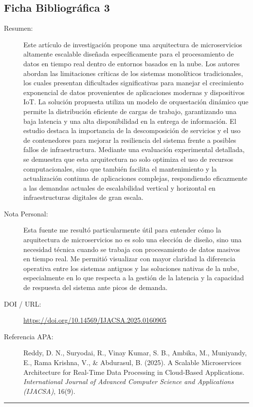 \documentclass[12pt]{article}
\begin{document}
\subsection{Ficha Bibliográfica 3}
\begin{description}
    \item[Resumen:] Este artículo de investigación propone una arquitectura de microservicios altamente escalable diseñada específicamente para el procesamiento de datos en tiempo real dentro de entornos basados en la nube. Los autores abordan las limitaciones críticas de los sistemas monolíticos tradicionales, los cuales presentan dificultades significativas para manejar el crecimiento exponencial de datos provenientes de aplicaciones modernas y dispositivos IoT. La solución propuesta utiliza un modelo de orquestación dinámico que permite la distribución eficiente de cargas de trabajo, garantizando una baja latencia y una alta disponibilidad en la entrega de información. El estudio destaca la importancia de la descomposición de servicios y el uso de contenedores para mejorar la resiliencia del sistema frente a posibles fallos de infraestructura. Mediante una evaluación experimental detallada, se demuestra que esta arquitectura no solo optimiza el uso de recursos computacionales, sino que también facilita el mantenimiento y la actualización continua de aplicaciones complejas, respondiendo eficazmente a las demandas actuales de escalabilidad vertical y horizontal en infraestructuras digitales de gran escala.
    \item[Nota Personal:] Esta fuente me resultó particularmente útil para entender cómo la arquitectura de microservicios no es solo una elección de diseño, sino una necesidad técnica cuando se trabaja con procesamiento de datos masivos en tiempo real. Me permitió visualizar con mayor claridad la diferencia operativa entre los sistemas antiguos y las soluciones nativas de la nube, especialmente en lo que respecta a la gestión de la latencia y la capacidad de respuesta del sistema ante picos de demanda.
    \item[DOI / URL:] \url{https://doi.org/10.14569/IJACSA.2025.0160905}
    \item[Referencia APA:] Reddy, D. N., Suryodai, R., Vinay Kumar, S. B., Ambika, M., Muniyandy, E., Rama Krishna, V., \& Abdurasul, B. (2025). A Scalable Microservices Architecture for Real-Time Data Processing in Cloud-Based Applications. \textit{International Journal of Advanced Computer Science and Applications (IJACSA)}, 16(9).
\end{description}
\noindent\rule{\textwidth}{0.4pt}
\vspace{3.5cm}
\end{document}
